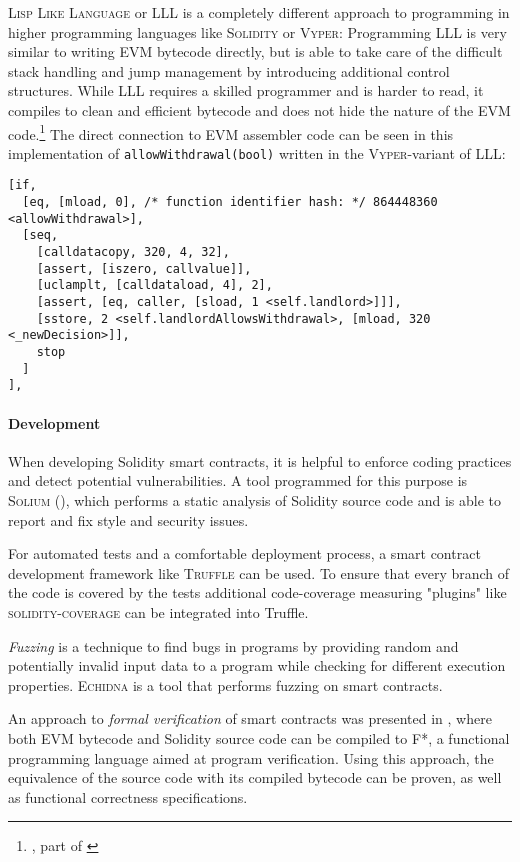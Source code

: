 \textsc{Lisp Like Language} or LLL is a completely different approach to programming in higher programming languages like \textsc{Solidity} or \textsc{Vyper}: Programming \textsc{LLL} is very similar to writing EVM bytecode directly, but is able to take care of the difficult stack handling and jump management by introducing additional control structures. While \textsc{LLL} requires a skilled programmer and is harder to read, it compiles to clean and efficient bytecode and does not hide the nature of the EVM code.\footnote{\cite{github:llldocs}, part of \cite{github:vyper}} The direct connection to EVM assembler code can be seen in this implementation of \texttt{allowWithdrawal(bool)} written in the \textsc{Vyper}-variant of \textsc{LLL}:
\begin{verbatim}
[if,
  [eq, [mload, 0], /* function identifier hash: */ 864448360 <allowWithdrawal>],
  [seq,
    [calldatacopy, 320, 4, 32],
    [assert, [iszero, callvalue]],
    [uclamplt, [calldataload, 4], 2],
    [assert, [eq, caller, [sload, 1 <self.landlord>]]],
    [sstore, 2 <self.landlordAllowsWithdrawal>, [mload, 320 <_newDecision>]],
    stop
  ]
],
\end{verbatim}

\paragraph{Development}
When developing Solidity smart contracts, it is helpful to enforce coding practices and detect potential vulnerabilities. A tool programmed for this purpose is \textsc{Solium} (\cite{github:solium}), which performs a static analysis of Solidity source code and is able to report and fix style and security issues.

For automated tests and a comfortable deployment process, a smart contract development framework like \textsc{Truffle} \cite{github:truffle} can be used. To ensure that every branch of the code is covered by the tests additional code-coverage measuring "plugins" like \textsc{solidity-coverage} \cite{github:soliditycoverage} can be integrated into Truffle.

\textit{Fuzzing} is a technique to find bugs in programs by providing random and potentially invalid input data to a program while checking for different execution properties. \textsc{Echidna} is a tool that performs fuzzing on smart contracts.

An approach to \textit{formal verification} of smart contracts was presented in \cite{bhargavan:formalsolidity}, where both EVM bytecode and Solidity source code can be compiled to \textsc{F*}, a functional programming language aimed at program verification. Using this approach, the equivalence of the source code with its compiled bytecode can be proven, as well as functional correctness specifications.

